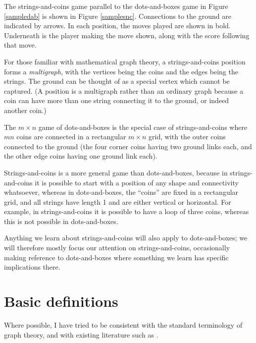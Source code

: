 \documentclass[a4paper,twocolumn]{article}
\begin{document}
The strings-and-coins game parallel to the dots-and-boxes game in
Figure \ref{sampledab} is shown in Figure \ref{samplesnc}. Connections
to the ground are indicated by arrows. In each position, the moves
played are shown in bold. Underneath is the player making the move
shown, along with the score following that move.

\begin{figure*}
  \centering
  \def\svgscale{0.7}
  
  \caption{Sample strings-and-coins game equivalent to Figure \ref{sampledab}}
  \label{samplesnc}
\end{figure*}

For those familiar with mathematical graph theory, a strings-and-coins
position forms a \emph{multigraph}, with the vertices being the coins
and the edges being the strings. The ground can be thought of as a
special vertex which cannot be captured. (A position is a multigraph
rather than an ordinary graph because a coin can have more than one
string connecting it to the ground, or indeed another coin.)

The $m \times n$ game of dots-and-boxes is the special case of
strings-and-coins where $mn$ coins are connected in a rectangular $m
\times n$ grid, with the outer coins connected to the ground (the four
corner coins having two ground links each, and the other edge coins
having one ground link each).

Strings-and-coins is a more general game than dots-and-boxes, because
in strings-and-coins it is possible to start with a position of any
shape and connectivity whatsoever, whereas in dots-and-boxes, the
``coins'' are fixed in a rectangular grid, and all strings have length
1 and are either vertical or horizontal. For example, in
strings-and-coins it is possible to have a loop of three coins,
whereas this is not possible in dots-and-boxes.

Anything we learn about strings-and-coins will also apply to
dots-and-boxes; we will therefore mostly focus our attention on
strings-and-coins, occasionally making reference to dots-and-boxes
where something we learn has specific implications there.

\section{Basic definitions}

Where possible, I have tried to be consistent with the standard
terminology of graph theory, and with existing literature such as
\cite{berl}.
\end{document}
